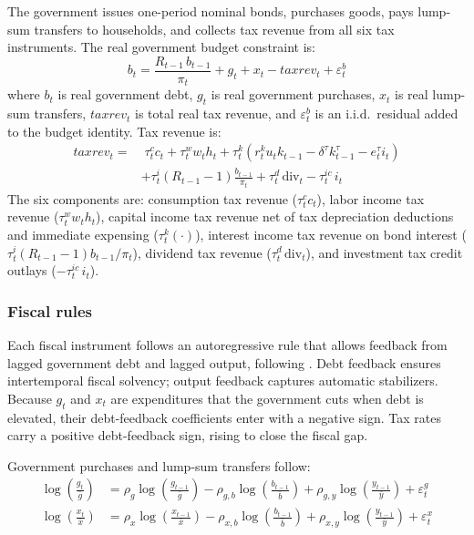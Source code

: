 \documentclass[article,11pt,letterpaper,fleqn]{article}
\theoremstyle{definition}
\numberwithin{equation}{section}
\begin{document}
The government issues one-period nominal bonds, purchases goods, pays lump-sum transfers to households, and collects tax revenue from all six tax instruments. The real government budget constraint is:
\begin{equation}\label{eq:gbc}
b_t = \frac{R_{t-1}\,b_{t-1}}{\pi_t} + g_t + x_t - taxrev_t + \varepsilon_t^b
\end{equation}
where $b_t$ is real government debt, $g_t$ is real government purchases, $x_t$ is real lump-sum transfers, $taxrev_t$ is total real tax revenue, and $\varepsilon_t^b$ is an i.i.d.\ residual added to the budget identity. Tax revenue is:
\begin{equation}\label{eq:taxrev}
\begin{split}
taxrev_t = &\;\tau_t^c c_t + \tau_t^w w_t h_t + \tau_t^k\!\left(r_t^k u_t k_{t-1} - \delta^{\tau}k_{t-1}^{\tau} - e_t^{\tau}i_t\right) \\
           & + \tau_t^i(R_{t-1}-1)\frac{b_{t-1}}{\pi_t} + \tau_t^d\,\text{div}_t - \tau_t^{ic}\,i_t
\end{split}
\end{equation}
The six components are: consumption tax revenue ($\tau_t^c c_t$), labor income tax revenue ($\tau_t^w w_t h_t$), capital income tax revenue net of tax depreciation deductions and immediate expensing ($\tau_t^k(\cdot)$), interest income tax revenue on bond interest ($\tau_t^i(R_{t-1}-1)b_{t-1}/\pi_t$), dividend tax revenue ($\tau_t^d\,\text{div}_t$), and investment tax credit outlays ($-\tau_t^{ic}\,i_t$).

\subsubsection*{Fiscal rules}

Each fiscal instrument follows an autoregressive rule that allows feedback from lagged government debt and lagged output, following \citet{Zubairy2014}. Debt feedback ensures intertemporal fiscal solvency; output feedback captures automatic stabilizers. Because $g_t$ and $x_t$ are expenditures that the government cuts when debt is elevated, their debt-feedback coefficients enter with a negative sign. Tax rates carry a positive debt-feedback sign, rising to close the fiscal gap.

Government purchases and lump-sum transfers follow:
\begin{align}
\log\!\left(\frac{g_t}{\bar{g}}\right) &= \rho_g\log\!\left(\frac{g_{t-1}}{\bar{g}}\right) - \rho_{g,b}\log\!\left(\frac{b_{t-1}}{\bar{b}}\right) + \rho_{g,y}\log\!\left(\frac{y_{t-1}}{\bar{y}}\right) + \varepsilon_t^g \label{eq:grule} \\
\log\!\left(\frac{x_t}{\bar{x}}\right) &= \rho_{x}\log\!\left(\frac{x_{t-1}}{\bar{x}}\right) - \rho_{x,b}\log\!\left(\frac{b_{t-1}}{\bar{b}}\right) + \rho_{x,y}\log\!\left(\frac{y_{t-1}}{\bar{y}}\right) + \varepsilon_t^{x} \label{eq:trrule}
\end{align}
\end{document}
